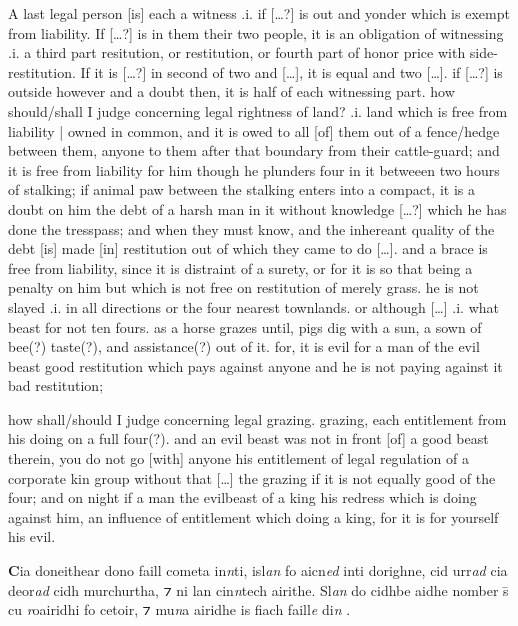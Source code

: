 \documentclass[11pt]{article}
\begin{document}
\begin{pages}
  \begin{Rightside}
    \beginnumbering
   \pstart
   A last legal person [is] each a witness .i. if [\ldots{}?] is out and yonder which is exempt from liability.  If [\ldots{}?] is in them their two people, it is an obligation of witnessing .i. a third part resitution, or restitution, or fourth part of honor price with side-restitution.  If it is [\ldots{}?] in second of two and [\ldots{}], it is equal and two [\ldots{}]. if [\ldots{}?] is outside however and a doubt then, it is half of each witnessing part.  how should/shall I judge concerning legal rightness of land? .i. land which is free from liability | owned in common, and it is owed to all [of] them out of a fence/hedge between them, anyone to them after that boundary from their cattle-guard; and it is free from liability for him though he plunders four in it betweeen two hours of stalking; if animal paw between the stalking enters into a compact, it is a doubt on him the debt of a harsh man in it without knowledge [\ldots{}?] which he has done the tresspass; and when they must know, and the inhereant quality of the debt [is] made [in] restitution out of which they came to do [\ldots{}]. and a brace is free from liability, since it is distraint of a surety, or for it is so that being a penalty on him but which is not free on restitution of merely grass.  he is not slayed .i. in all directions or the four nearest townlands. or although [\ldots{}] .i. what beast for not ten fours. as a horse grazes until, pigs dig with a sun, a sown of bee(?) taste(?), and assistance(?) out of it. for, it is evil for a man of the evil beast good restitution which pays against anyone and he is not paying against it bad restitution; 
    \pend
  
    \pstart
    how shall/should I judge concerning legal grazing. grazing, each entitlement from his doing on a full four(?). and an evil beast was not in front [of] a good beast therein, you do not go [with] anyone his entitlement of legal regulation of a corporate kin group without that [\ldots{}] the grazing if it is not equally good of the four; and on night if a man the evilbeast of a king his redress which is doing against him, an influence of entitlement which doing a king, for it is for yourself his evil. 
    \pend
    \endnumbering
  \end{Rightside}
  \Pages

  \begin{Leftside}
    \beginnumbering
    \pstart
    \textbf{C}ia doneithear dono faill cometa in\emph{n}ti, isl\emph{an} fo aicn\emph{ed} inti dorighne, cid urr\emph{ad} cia deor\emph{ad} cidh murchurtha, ⁊ ni lan cin\emph{n}tech airithe.  Sl\emph{an} do cidhbe aidhe nomber \={s} cu \emph{r}oairidhi fo cetoir, ⁊ mu\emph{n}a airidhe is fiach faill\emph{e} di\emph{n} .
    \pend


\end{Leftside}
\end{pages}
\end{document}
